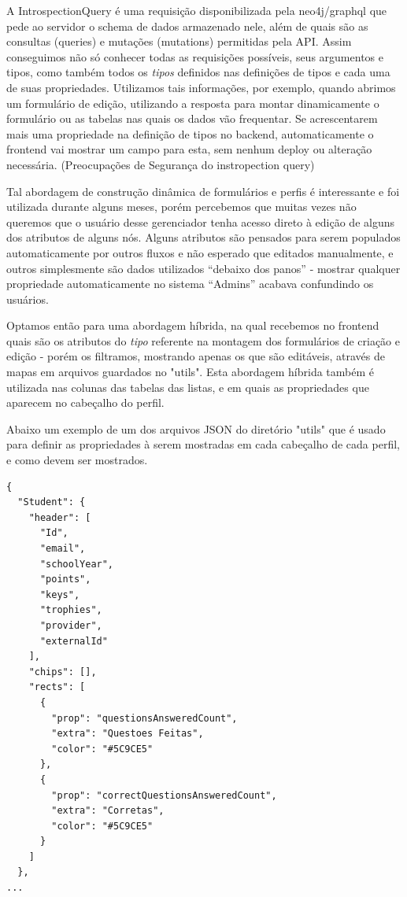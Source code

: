 A IntrospectionQuery é uma requisição disponibilizada pela neo4j/graphql que pede ao servidor o schema de dados armazenado nele, além de quais são as consultas (queries) e mutações (mutations) permitidas pela API. Assim conseguimos não só conhecer todas as requisições possíveis, seus argumentos e tipos, como também todos os \textit{tipos} definidos nas definições de tipos e cada uma de suas propriedades. Utilizamos tais informações, por exemplo, quando abrimos um formulário de edição, utilizando a resposta para montar dinamicamente o formulário ou as tabelas nas quais os dados vão frequentar. Se acrescentarem mais uma propriedade na definição de tipos no backend, automaticamente o frontend vai mostrar um campo para esta, sem nenhum deploy ou alteração necessária.
(Preocupações de Segurança do instropection query)

Tal abordagem de construção dinâmica de formulários e perfis é interessante e foi utilizada durante alguns meses, porém percebemos que muitas vezes não queremos que o usuário desse gerenciador tenha acesso direto à edição de alguns dos atributos de alguns nós. Alguns atributos são pensados para serem populados automaticamente por outros fluxos e não esperado que editados manualmente, e outros simplesmente são dados utilizados “debaixo dos panos” - mostrar qualquer propriedade automaticamente no sistema ``Admins'' acabava confundindo os usuários.

Optamos então para uma abordagem híbrida, na qual recebemos no frontend quais são os atributos do \textit{tipo} referente na montagem dos formulários de criação e edição - porém os filtramos, mostrando apenas os que são editáveis, através de mapas em arquivos guardados no "utils". Esta abordagem híbrida também é utilizada nas colunas das tabelas das listas, e em quais as propriedades que aparecem no cabeçalho do perfil.

Abaixo um exemplo de um dos arquivos JSON do diretório "utils" que é usado para definir as propriedades à serem mostradas em cada cabeçalho de cada perfil, e como devem ser mostrados.
\begin{lstlisting}
{
  "Student": {
    "header": [
      "Id",
      "email",
      "schoolYear",
      "points",
      "keys",
      "trophies",
      "provider",
      "externalId"
    ],
    "chips": [],
    "rects": [
      {
        "prop": "questionsAnsweredCount",
        "extra": "Questoes Feitas",
        "color": "#5C9CE5"
      },
      {
        "prop": "correctQuestionsAnsweredCount",
        "extra": "Corretas",
        "color": "#5C9CE5"
      }
    ]
  },
...
\end{lstlisting}

